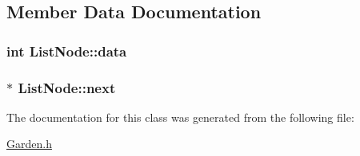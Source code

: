 \subsection{Member Data Documentation}
\hypertarget{class_list_node_aa048672d5b781b9c8decaa86203fc5d5}{
\subsubsection[{data}]{\setlength{\rightskip}{0pt plus 5cm}int List\-Node\-::data}}\label{class_list_node_aa048672d5b781b9c8decaa86203fc5d5}
\hypertarget{class_list_node_ad78b392c2ddc25c3243d0c2f30692fb1}{
\subsubsection[{next}]{$\ast$ List\-Node\-::next}}\label{class_list_node_ad78b392c2ddc25c3243d0c2f30692fb1}


The documentation for this class was generated from the following file\-:\begin{DoxyCompactItemize}
\item 
\hyperlink{_garden_8h}{Garden.\-h}\end{DoxyCompactItemize}
